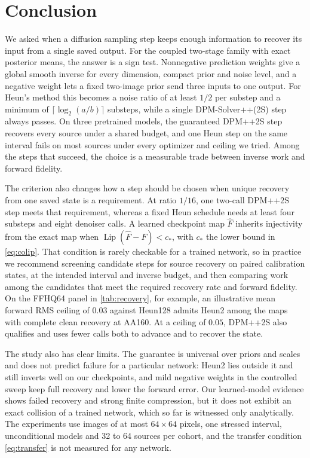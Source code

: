 \section{Conclusion}
\label{sec:conclusion}
We asked when a diffusion sampling step keeps enough information to recover its input from a single saved output. For the coupled two-stage family with exact posterior means, the answer is a sign test. Nonnegative prediction weights give a global smooth inverse for every dimension, compact prior and noise level, and a negative weight lets a fixed two-image prior send three inputs to one output. For Heun's method this becomes a noise ratio of at least $1/2$ per substep and a minimum of $\lceil\log_2(a/b)\rceil$ substeps, while a single DPM-Solver++(2S) step always passes. On three pretrained models, the guaranteed DPM++2S step recovers every source under a shared budget, and one Heun step on the same interval fails on most sources under every optimizer and ceiling we tried. Among the steps that succeed, the choice is a measurable trade between inverse work and forward fidelity.

The criterion also changes how a step should be chosen when unique recovery from one saved state is a requirement. At ratio $1/16$, one two-call DPM++2S step meets that requirement, whereas a fixed Heun schedule needs at least four substeps and eight denoiser calls. A learned checkpoint map $\widehat F$ inherits injectivity from the exact map when $\operatorname{Lip}(\widehat F-F)<c_*$, with $c_*$ the lower bound in \cref{eq:colip}. That condition is rarely checkable for a trained network, so in practice we recommend screening candidate steps for source recovery on paired calibration states, at the intended interval and inverse budget, and then comparing work among the candidates that meet the required recovery rate and forward fidelity. On the FFHQ64 panel in \cref{tab:recovery}, for example, an illustrative mean forward RMS ceiling of $0.03$ against Heun128 admits Heun2 among the maps with complete clean recovery at AA160. At a ceiling of $0.05$, DPM++2S also qualifies and uses fewer calls both to advance and to recover the state.

The study also has clear limits. The guarantee is universal over priors and scales and does not predict failure for a particular network: Heun2 lies outside it and still inverts well on our checkpoints, and mild negative weights in the controlled sweep keep full recovery and lower the forward error. Our learned-model evidence shows failed recovery and strong finite compression, but it does not exhibit an exact collision of a trained network, which so far is witnessed only analytically. The experiments use images of at most $64\times64$ pixels, one stressed interval, unconditional models and 32 to 64 sources per cohort, and the transfer condition \cref{eq:transfer} is not measured for any network.

